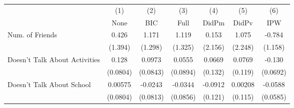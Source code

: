 {
\def\sym#1{\ifmmode^{#1}\else\(^{#1}\)\fi}
\begin{tabular}{l*{6}{c}}
\toprule
            &\multicolumn{1}{c}{(1)}&\multicolumn{1}{c}{(2)}&\multicolumn{1}{c}{(3)}&\multicolumn{1}{c}{(4)}&\multicolumn{1}{c}{(5)}&\multicolumn{1}{c}{(6)}\\
            &\multicolumn{1}{c}{None}&\multicolumn{1}{c}{BIC}&\multicolumn{1}{c}{Full}&\multicolumn{1}{c}{DidPm}&\multicolumn{1}{c}{DidPv}&\multicolumn{1}{c}{IPW}\\
\midrule
Num. of Friends&       0.426         &       1.171         &       1.119         &       0.153         &       1.075         &      -0.784         \\
            &     (1.394)         &     (1.298)         &     (1.325)         &     (2.156)         &     (2.248)         &     (1.158)         \\
\addlinespace
Doesn't Talk About Activities&       0.128         &      0.0973         &      0.0555         &      0.0669         &      0.0769         &      -0.130         \\
            &    (0.0804)         &    (0.0843)         &    (0.0894)         &     (0.132)         &     (0.119)         &    (0.0692)         \\
\addlinespace
Doesn't Talk About School&     0.00575         &     -0.0243         &     -0.0344         &     -0.0912         &     0.00208         &     -0.0588         \\
            &    (0.0804)         &    (0.0813)         &    (0.0856)         &     (0.121)         &     (0.115)         &    (0.0585)         \\
\bottomrule
\end{tabular}
}
